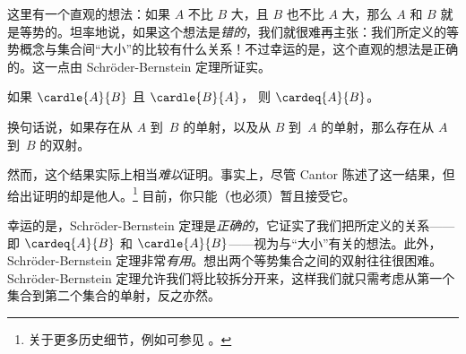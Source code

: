 \documentclass[../../../include/open-logic-section]{subfiles}
\begin{document}


\begin{explain}
这里有一个直观的想法：如果 $A$ 不比 $B$ 大，且 $B$ 也不比 $A$ 大，那么 $A$ 和 $B$ 就是等势的。坦率地说，如果这个想法是\emph{错的}，我们就很难再主张：我们所定义的等势概念与集合间“大小”的比较有什么关系！不过幸运的是，这个直观的想法是正确的。这一点由 Schr\"oder-Bernstein 定理所证实。
\end{explain}

\begin{thm}
	如果 $\cardle{A}{B}$ 且 $\cardle{B}{A}$，
	则 $\cardeq{A}{B}$。
\end{thm}

\begin{explain}
换句话说，如果存在从 $A$ 到~$B$ 的单射，以及从 $B$ 到~$A$ 的单射，那么存在从 $A$ 到~$B$ 的双射。

然而，这个结果实际上相当\emph{难以}证明。事实上，尽管 Cantor 陈述了这一结果，但给出证明的却是他人。\footnote{关于更多历史细节，例如可参见 \citet[pp.~165--6]{Potter2004}。}
%
目前，你只能（也必须）暂且接受它。

幸运的是，Schr\"oder-Bernstein 定理是\emph{正确的}，它证实了我们把所定义的关系——即 $\cardeq{A}{B}$ 和 $\cardle{A}{B}$——视为与“大小”有关的想法。此外，Schr\"oder-Bernstein 定理非常\emph{有用}。想出两个等势集合之间的双射往往很困难。Schr\"oder-Bernstein 定理允许我们将比较拆分开来，这样我们就只需考虑从第一个集合到第二个集合的单射，反之亦然。
\end{explain}
\end{document}
